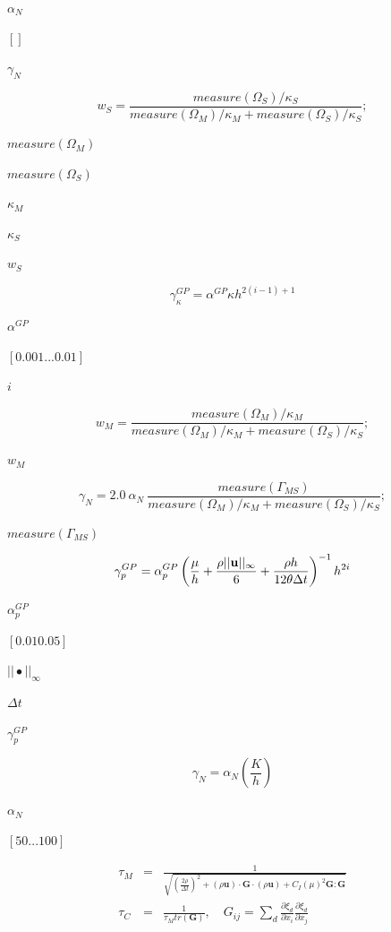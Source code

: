 \documentclass{article}
\begin{document}
$ \alpha_{N} $
\pagebreak

$ [  ] $
\pagebreak

$ \gamma_{N} $
\pagebreak

\[
w_{S} = \frac{ measure(\Omega_{S}) / \kappa_{S} }{ measure(\Omega_{M}) / \kappa_{M} + measure(\Omega_{S}) / \kappa_{S} };
\]
\pagebreak

$ measure(\Omega_{M}) $
\pagebreak

$ measure(\Omega_{S}) $
\pagebreak

$ \kappa_{M} $
\pagebreak

$ \kappa_{S} $
\pagebreak

$ w_{S} $
\pagebreak

\[
\gamma_{\kappa}^{GP} = \alpha^{GP} \kappa h^{2(i-1)+1}
\]
\pagebreak

$ \alpha^{GP} $
\pagebreak

$ [ 0.001 ... 0.01 ] $
\pagebreak

$ i $
\pagebreak

\[
w_{M} = \frac{ measure(\Omega_{M}) / \kappa_{M} }{ measure(\Omega_{M}) / \kappa_{M} + measure(\Omega_{S}) / \kappa_{S} };
\]
\pagebreak

$ w_{M} $
\pagebreak

\[
\gamma_{N} = 2.0\ \alpha_{N}\ \frac{ measure(\Gamma_{MS}) }{ measure(\Omega_{M}) / \kappa_{M} + measure(\Omega_{S}) / \kappa_{S} };
\]
\pagebreak

$ measure(\Gamma_{MS}) $
\pagebreak

\[
\gamma_{p}^{GP} = \alpha_{p}^{GP} \left( 
\frac{ \mu }{ h } 
+ \frac{ \rho ||\mathbf{u}||_{\infty} }{ 6 } 
+ \frac{ \rho h }{ 12 \theta \Delta t }  
\right)^{-1} h^{2i}\\
\]
\pagebreak

$ \alpha_{p}^{GP} $
\pagebreak

$ [ 0.01 0.05 ] $
\pagebreak

$ || \bullet ||_{\infty} $
\pagebreak

$ \Delta t $
\pagebreak

$ \gamma_{p}^{GP} $
\pagebreak

\[
\gamma_N = \alpha_N \left( 
\frac{K}{h}
\right)
\]
\pagebreak

$ \alpha_N $
\pagebreak

$ [ 50 ... 100 ] $
\pagebreak

\[
\begin{array}{lll}
\tau_{M} & = &
\frac{1}{\sqrt{ (\frac{2 \rho}{\Delta t})^2 
+ (\rho \mathbf{u}) \cdot \mathbf{G} \cdot (\rho \mathbf{u}) 
+ C_I (\mu)^2 \mathbf{G} : \mathbf{G}}}\\

\tau_{C} & = & \frac{1}{\tau_{M} tr(\mathbf{G})}, 
\quad G_{ij} = \sum_d \frac{\partial \xi_d}{\partial x_i} \frac{\partial \xi_d}{\partial x_j}\\
\end{array}
\]
\pagebreak
\end{document}
